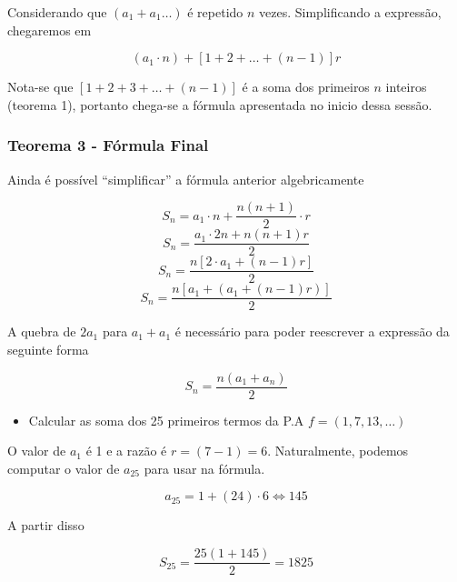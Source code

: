Considerando que $(a_{1} + a_{1} \dots)$ é repetido $n$ vezes. Simplificando a expressão, chegaremos em

\begin{tcolorbox}[colback=LightYellow]
\[(a_{1}\cdot n) + [1 + 2 + \dots + (n - 1)]r\]
\end{tcolorbox}

Nota-se que $[1 + 2 + 3 + \dots + (n - 1)]$ é a soma dos primeiros $n$ inteiros (teorema 1), portanto chega-se a fórmula apresentada no inicio dessa sessão.

\subsubsection{Teorema 3 - Fórmula Final}

Ainda é possível ``simplificar'' a fórmula anterior algebricamente

\begin{tcolorbox}[colback=LightYellow]
\[S_{n} = a_{1} \cdot n + \frac{n(n + 1)}{2}\cdot r\]
\[S_{n} = \frac{a_{1}\cdot 2n + n(n + 1)r}{2}\]
\[S_{n} = \frac{n[2\cdot a_{1} + (n - 1)r]}{2}\]
\[S_{n} = \frac{n[a_{1} + (a_{1} + (n - 1)r)]}{2}\]
\end{tcolorbox}

A quebra de $2 a_{1}$ para $a_{1} + a_{1}$ é necessário para poder reescrever a expressão da seguinte forma

\begin{tcolorbox}[colback=LightBlue]
\[S_{n} = \frac{n(a_{1} + a_{n})}{2}\]
\end{tcolorbox}

\begin{tcolorbox}[colback=LightYellow]
\begin{itemize}
  \item Calcular as soma dos 25 primeiros termos da P.A $f = (1, 7, 13, \dots)$
\end{itemize}
\end{tcolorbox}

\begin{tcolorbox}[colback=LightYellow]

O valor de $a_{1}$ é 1 e a razão é $r = (7 - 1) = 6$. Naturalmente, podemos computar o valor de $a_{25}$ para usar na fórmula.

\[a_{25} = 1 + (24)\cdot 6 \Leftrightarrow 145\]

A partir disso

\[S_{25} = \frac{25(1 + 145)}{2} = 1825\]
\end{tcolorbox}
